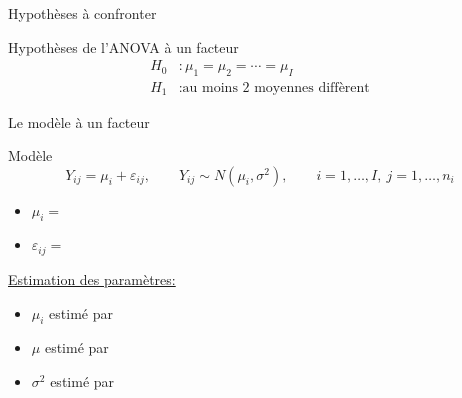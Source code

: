 \documentclass{BeamerTemplate}
\begin{document}
\begin{frame}[t]{Hypothèses à confronter}

\vspace{1cm}
\begin{Boite}{Hypothèses de l'ANOVA à un facteur}
\begin{align*}
H_0 &: \mu_1 = \mu_2 = \cdots = \mu_I\\[2mm]
H_1 &: \text{au moins 2 moyennes diffèrent}
\end{align*}
\end{Boite}

\end{frame}

\begin{frame}[t]{Le modèle à un facteur}

\begin{Boite}{Modèle}
\[
Y_{ij} = \mu_i + \varepsilon_{ij}, \qquad Y_{ij}\sim N(\mu_i,\sigma^2),
\qquad i=1,\ldots,I,\ j=1,\ldots,n_i
\]
\end{Boite}

\begin{itemize}\itemsep1mm
  \item $\mu_i = $
  \item $\varepsilon_{ij} = $
\end{itemize}

\medskip
\underline{Estimation des paramètres:}

\begin{itemize}\itemsep1mm
  \item $\mu_i$ estimé par
  \item $\mu$ estimé par
  \item $\sigma^2$ estimé par
\end{itemize}

\end{frame}
\end{document}
